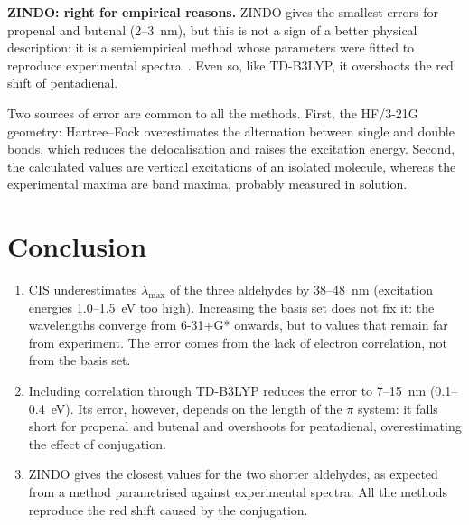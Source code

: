 \documentclass[10pt,a4paper]{article}
\begin{document}
\textbf{ZINDO: right for empirical reasons.} ZINDO gives the smallest
errors for propenal and butenal (2--3~nm), but this is not a sign of a
better physical description: it is a semiempirical method whose parameters
were fitted to reproduce experimental spectra~\cite{Ridley1973}. Even so,
like TD-B3LYP, it overshoots the red shift of pentadienal.

Two sources of error are common to all the methods. First, the HF/3-21G
geometry: Hartree--Fock overestimates the alternation between single and
double bonds, which reduces the delocalisation and raises the excitation
energy. Second, the calculated values are vertical excitations of an
isolated molecule, whereas the experimental maxima are band maxima,
probably measured in solution.

\section{Conclusion} %

\begin{enumerate}
  \item CIS underestimates $\lambda_\mathrm{max}$ of the three aldehydes by
    38--48~nm (excitation energies 1.0--1.5~eV too high). Increasing the
    basis set does not fix it: the wavelengths converge from 6-31+G*
    onwards, but to values that remain far from experiment. The error comes
    from the lack of electron correlation, not from the basis set.
  \item Including correlation through TD-B3LYP reduces the error to
    7--15~nm (0.1--0.4~eV). Its error, however, depends on the length of
    the $\pi$ system: it falls short for propenal and butenal and
    overshoots for pentadienal, overestimating the effect of conjugation.
  \item ZINDO gives the closest values for the two shorter aldehydes, as
    expected from a method parametrised against experimental spectra. All
    the methods reproduce the red shift caused by the conjugation.
\end{enumerate}


\end{document}
